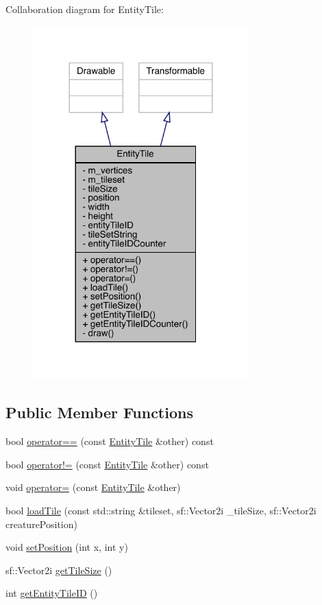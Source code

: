 Collaboration diagram for Entity\+Tile\+:
\nopagebreak
\begin{figure}[H]
\begin{center}
\leavevmode
\includegraphics[width=236pt]{d6/dc8/class_entity_tile__coll__graph}
\end{center}
\end{figure}
\subsection*{Public Member Functions}
\begin{DoxyCompactItemize}
\item 
bool \mbox{\hyperlink{class_entity_tile_a2b8c81d35530991c08ca2b6a76e436bf}{operator==}} (const \mbox{\hyperlink{class_entity_tile}{Entity\+Tile}} \&other) const
\item 
bool \mbox{\hyperlink{class_entity_tile_ad5adfda10fac26073effad1f16d6ffb6}{operator!=}} (const \mbox{\hyperlink{class_entity_tile}{Entity\+Tile}} \&other) const
\item 
void \mbox{\hyperlink{class_entity_tile_a81dbf6b294b80d6edcc830a243cdfae8}{operator=}} (const \mbox{\hyperlink{class_entity_tile}{Entity\+Tile}} \&other)
\item 
bool \mbox{\hyperlink{class_entity_tile_a1a6b6b995ad942e7850f14cc6e693bbc}{load\+Tile}} (const std\+::string \&tileset, sf\+::\+Vector2i \+\_\+tile\+Size, sf\+::\+Vector2i creature\+Position)
\item 
void \mbox{\hyperlink{class_entity_tile_a7b9e5be8dc4017eb5af8e4fda7add3c4}{set\+Position}} (int x, int y)
\item 
sf\+::\+Vector2i \mbox{\hyperlink{class_entity_tile_a5b0c178bfb2b65842c9c70ffafd857a7}{get\+Tile\+Size}} ()
\item 
int \mbox{\hyperlink{class_entity_tile_a2a4d57fa026ee00140e4cfd4ccc0d2b0}{get\+Entity\+Tile\+ID}} ()
\end{DoxyCompactItemize}
